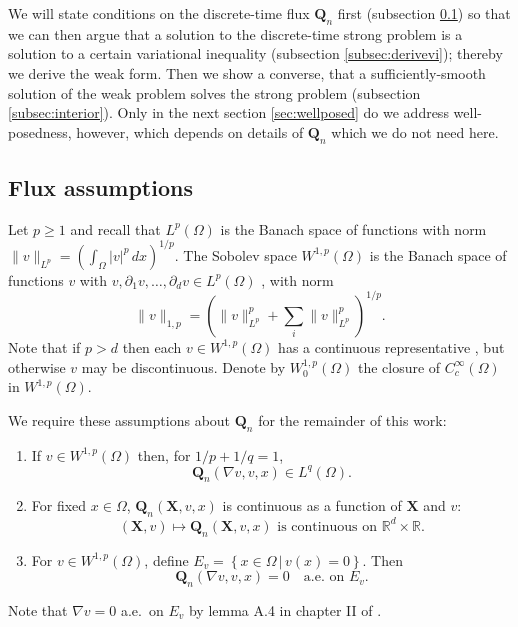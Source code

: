 \documentclass[final,leqno,onefignum,onetabnum]{siamltex1213bueler}
\newcommand\bQ{\mathbf{Q}}
\newcommand\bX{\mathbf{X}}
\renewcommand{\grad}{\nabla}
\newcommand\RR{\mathbb{R}}
\begin{document}
We will state conditions on the discrete-time flux $\bQ_n$ first (subsection \ref{subsec:fluxassumptions}) so that we can then argue that a solution to the discrete-time strong problem is a solution to a certain variational inequality (subsection \ref{subsec:derivevi}); thereby we derive the weak form.  Then we show a converse, that a sufficiently-smooth solution of the weak problem solves the strong problem (subsection \ref{subsec:interior}).  Only in the next section \ref{sec:wellposed} do we address well-posedness, however, which depends on details of $\bQ_n$ which we do not need here.

\subsection{Flux assumptions} \label{subsec:fluxassumptions}  Let $p\ge 1$ and recall that $L^p (\Omega)$ is the Banach space of functions with norm $\|v\|_{L^p} = \left(\int_\Omega |v|^p\,dx\right)^{1/p}$.  The Sobolev space $W^{1,p}(\Omega)$ is the Banach space of functions $v$ with $v,\partial_1 v,\dots,\partial_d v \in L^p(\Omega)$ \cite{Evans}, with norm
\begin{equation}
  \|v\|_{1,p} = \left(\|v\|_{L^p}^p + \sum_i \|v\|_{L^p}^p\right)^{1/p}.  \label{eq:norm}
\end{equation}
Note that if $p>d$ then each $v\in W^{1,p}(\Omega)$ has a continuous representative \cite[``Morrey's inequality'']{Evans}, but otherwise $v$ may be discontinuous.  Denote by $W_0^{1,p}(\Omega)$ the closure of $C_c^\infty(\Omega)$ in $W^{1,p}(\Omega)$.

We require these assumptions about $\bQ_n$ for the remainder of this work:

\medskip
\renewcommand{\labelenumi}{(\roman{enumi})}
\begin{enumerate}
\item If $v \in W^{1,p}(\Omega)$ then, for $1/p + 1/q = 1$,
\begin{equation}
\bQ_n(\grad v,v,x) \in L^q(\Omega). \label{eq:QisLq}
\end{equation}
\item For fixed $x\in \Omega$, $\bQ_n(\bX,v,x)$ is continuous as a function of $\bX$ and $v$:
\begin{equation}
(\bX,v) \mapsto \bQ_n(\bX,v,x) \text{ is continuous on } \RR^d \times \RR.  \label{eq:Qiscontinuous}
\end{equation}
\item For $v \in W^{1,p}(\Omega)$, define $E_v = \left\{x\in\Omega \,\big|\, v(x) = 0\right\}$.  Then
\begin{equation}
\bQ_n(\grad v,v,x)=0 \quad \text{a.e.~on } E_v. \label{eq:Qiszero}
\end{equation}
\end{enumerate}
Note that $\grad v = 0$ a.e.~on $E_v$ by lemma A.4 in chapter II of \cite{KinderlehrerStampacchia}.
\end{document}
